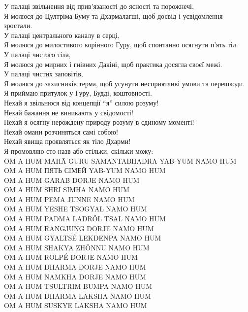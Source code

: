 \documentclass{article}
\begin{document}
У палаці звільнення від прив’язаності до ясності та порожнечі, \\
Я молюся до Цултріма Буму та Дхармалагші, щоб досвід і усвідомлення зростали. \\
У палаці центрального каналу в серці, \\
Я молюся до милостивого корінного Гуру, щоб спонтанно осягнути п’ять тіл. \\
У палаці чистого тіла, \\
Я молюся до мирних і гнівних Дакіні, щоб практика досягла своєї межі. \\
У палаці чистих заповітів, \\
Я молюся до захисників терма, щоб усунути несприятливі умови та перешкоди. \\
Я приймаю притулок у Гуру, Будді, коштовності. \\
Нехай я звільнюся від концепції “я” силою розуму! \\
Нехай бажання не виникають у свідомості! \\
Нехай я осягну нерождену природу розуму в єдиному моменті! \\
Нехай омани розчиняться самі собою! \\
Нехай явища проявляться як тіло Дхарми! \\

Я промовляю сто назв або стільки, скільки можу: \\

\noindent OM A HUM MAHĀ GURU SAMANTABHADRA YAB-YUM NAMO HUM \\
OM A HUM ПЯТЬ СІМЕЙ YAB-YUM NAMO HUM \\
OM A HUM GARAB DORJE NAMO HUM \\
OM A HUM SHRI SIMHA NAMO HUM \\
OM A HUM PEMA JUNNE NAMO HUM \\
OM A HUM YESHE TSOGYAL NAMO HUM \\
OM A HUM PADMA LADRÖL TSAL NAMO HUM \\
OM A HUM RANGJUNG DORJE NAMO HUM \\
OM A HUM GYALTSÉ LEKDENPA NAMO HUM \\
OM A HUM SHAKYA ZHÖNNU NAMO HUM \\
OM A HUM ROLPÉ DORJE NAMO HUM \\
OM A HUM DHARMA DORJE NAMO HUM \\
OM A HUM NAMKHA DORJE NAMO HUM \\
OM A HUM TSULTRIM BUMPA NAMO HUM \\
OM A HUM DHARMA LAKSHA NAMO HUM \\
OM A HUM SUSKYE LAKSHA NAMO HUM \\
\end{document}
